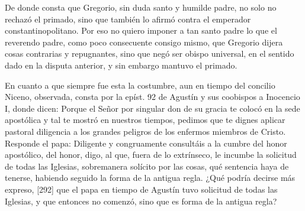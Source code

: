 De donde consta que Gregorio, sin duda santo y humilde padre, no solo no rechazó el primado, sino que también lo afirmó contra el emperador constantinopolitano. Por eso no quiero imponer a tan santo padre lo que el reverendo padre, como poco consecuente consigo mismo, que Gregorio dijera cosas contrarias y repugnantes, sino que negó ser obispo universal, en el sentido dado en la disputa anterior, y sin embargo mantuvo el primado.

En cuanto a que siempre fue esta la costumbre, aun en tiempo del concilio Niceno, observada, consta por la epíst. 92 de Agustín y sus coobispos a Inocencio I, donde dicen: Porque el Señor por singular don de su gracia te colocó en la sede apostólica y tal te mostró en nuestros tiempos, pedimos que te dignes aplicar pastoral diligencia a los grandes peligros de los enfermos miembros de Cristo. Responde el papa: Diligente y congruamente consultáis a la cumbre del honor apostólico, del honor, digo, al que, fuera de lo extrínseco, le incumbe la solicitud de todas las Iglesias, sobremanera solícito por las cosas, qué sentencia haya de tenerse, habiendo seguido la forma de la antigua regla. ¿Qué podría decirse más expreso, [292] que el papa en tiempo de Agustín tuvo solicitud de todas las Iglesias, y que entonces no comenzó, sino que es forma de la antigua regla?

